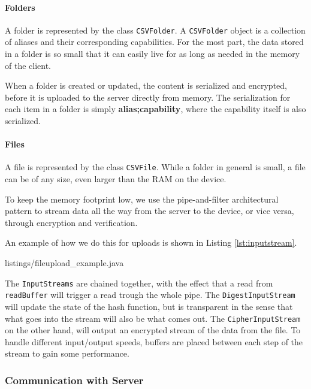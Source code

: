 \documentclass[pdftex,english,10pt,b5paper,twoside]{book}
\begin{document}
\paragraph{Folders}

A folder is represented by the class \texttt{CSVFolder}. A \texttt{CSVFolder} object is
a collection of aliases and their corresponding capabilities. For
the most part, the data stored in a folder is so small that it can easily live for
as long as needed in the memory of the client.

When a folder is created or updated, the content is serialized and encrypted,
before it is uploaded to the server directly from memory. The serialization for
each item in a folder is simply \textbf{alias;capability}, where the capability
itself is also serialized.

\paragraph{Files}

A file is represented by the class \texttt{CSVFile}. While a folder in general is small,
a file can be of any size, even larger than the \ac{RAM} on the device.

To keep the memory footprint low, we use the pipe-and-filter architectural
pattern to stream data all the way from the server to the device, or vice
versa, through encryption and verification.

An example of how we do this for uploads is shown in Listing
\ref{lst:inputstream}.


{listings/fileupload_example.java}

The \texttt{InputStreams} are chained together, with the effect that a read
from \texttt{readBuffer} will trigger a read trough the whole pipe. The
\texttt{DigestInputStream} will update the state of the hash function, but is
transparent in the sense that what goes into the stream will also be what comes
out. The \texttt{CipherInputStream} on the other hand, will output an encrypted
stream of the data from the file. To handle different input/output speeds,
buffers are placed between each step of the stream to gain some performance.

\subsubsection{Communication with Server}
\end{document}
